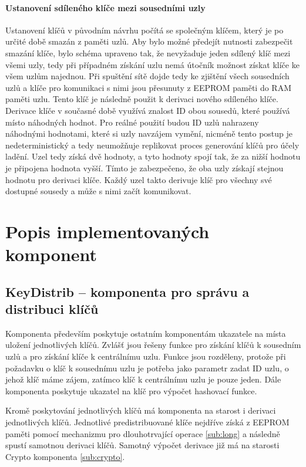 \documentclass[11pt,final,twoside]{fithesis2}
\begin{document}
\paragraph{Ustanovení sdíleného klíče mezi sousedními uzly} \label{par:derive}
Ustanovení klíčů v původním návrhu počítá se společným klíčem, který je po určité době smazán z paměti uzlů. Aby bylo možné předejít nutnosti zabezpečit smazání klíče, bylo schéma upraveno tak, 
že nevyžaduje jeden sdílený klíč mezi všemi uzly, tedy při případném získání uzlu nemá útočník možnost získat klíče ke všem uzlům najednou. Při spuštění sítě dojde tedy ke zjištění všech sousedních uzlů a 
klíče pro komunikaci s nimi jsou přesunuty z EEPROM paměti do RAM paměti uzlu. Tento klíč je následně použit k derivaci nového sdíleného klíče.
Derivace klíče v současné době využívá znalost ID obou sousedů, které používá místo náhodných hodnot. Pro reálné použití budou ID uzlů nahrazeny náhodnými hodnotami, které si uzly navzájem vymění, nicméně 
tento postup je nedeterministický a tedy neumožňuje replikovat proces generování klíčů pro účely ladění. Uzel tedy získá dvě hodnoty, a tyto hodnoty spojí tak, že za nižší hodnotu je připojena hodnota vyšší. 
Tímto je zabezpečeno, že oba uzly získají stejnou hodnotu pro derivaci klíče. Každý uzel takto derivuje klíč pro všechny své dostupné sousedy a může s nimi začít komunikovat.

\section{Popis implementovaných komponent}
\subsection{KeyDistrib -- komponenta pro správu a distribuci klíčů}

Komponenta především poskytuje ostatním komponentám ukazatele na místa uložení jednotlivých klíčů. Zvlášť jsou řešeny funkce pro získání klíčů k sousedním uzlů a pro získání klíče k centrálnímu uzlu. 
Funkce jsou rozděleny, protože při požadavku o klíč k sousednímu uzlu je potřeba jako parametr zadat ID uzlu, o jehož klíč máme zájem, zatímco klíč k centrálnímu uzlu je pouze jeden. Dále komponenta 
poskytuje ukazatel na klíč pro výpočet hashovací funkce.

Kromě poskytování jednotlivých klíčů má komponenta na starost i derivaci jednotlivých klíčů. Jednotlivé predistribuované klíče nejdříve získá z EEPROM paměti pomocí mechanizmu pro dlouhotrvající operace 
\ref{sub:long} a následně spustí samotnou derivaci klíčů. Samotný výpočet derivace již má na starosti Crypto komponenta \ref{sub:crypto}. 
\end{document}
